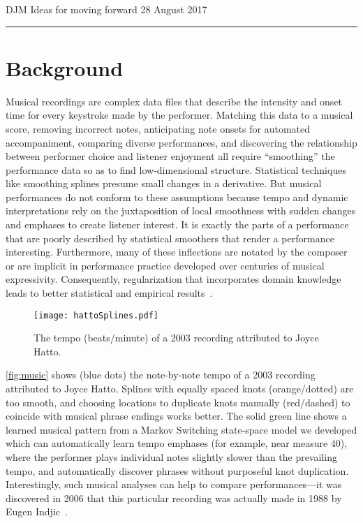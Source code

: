 \documentclass[11pt]{article}
\newcommand{\makeHeader}{\begin{center} 
DJM \hfill Ideas for moving forward \hfill 28 August 2017


\rule{\textwidth}{1pt}
\end{center}
}
\begin{document}
\suppressfloats
\makeHeader



\section{Background}

Musical recordings
are complex data files that describe the intensity and onset time
for every keystroke made by the performer. Matching this data to a
musical score, removing incorrect notes, anticipating note onsets for
automated accompaniment, comparing diverse performances, and
discovering the relationship between performer choice and listener
enjoyment all require ``smoothing'' the performance data so as to find
low-dimensional structure. Statistical
techniques like smoothing splines presume small changes in a
derivative. 
But musical performances do not conform to these assumptions because tempo and
dynamic interpretations rely on the juxtaposition of local smoothness
with sudden changes and emphases to create listener interest. It is
exactly the parts of a performance that are poorly described by
statistical smoothers that render a performance
interesting. Furthermore, many of these inflections are notated by the
composer or are implicit in performance practice developed over
centuries of musical expressivity. Consequently, regularization that
incorporates domain knowledge leads to better statistical and
empirical results~\citep{McDonald2016}. 

\begin{figure}
  \centering
  \texttt{[image: hattoSplines.pdf]}
  \caption{The tempo (beats/minute) of a 2003 recording attributed to Joyce
    Hatto.}
  \label{fig:music}
\end{figure}
\autoref{fig:music}
shows (blue dots) the note-by-note tempo of a 2003 recording
attributed to Joyce Hatto. Splines with
equally spaced knots (orange/dotted) are too smooth, and choosing locations
to duplicate knots manually (red/dashed)
to coincide with musical phrase endings works better. The solid green line 
shows a learned musical pattern from a Markov Switching
state-space model we developed which can
automatically learn tempo emphases (for example, near measure 40),
where the performer plays individual notes slightly slower than the
prevailing tempo, and automatically discover phrases
without purposeful knot 
duplication. Interestingly, such musical analyses can help to compare
performances---it was discovered in 2006 that this
particular recording was actually made in 1988 by Eugen
Indjic~\citep{CookSapp2009}. 
\end{document}
